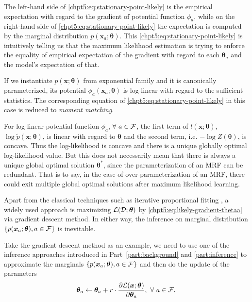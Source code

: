 The left-hand side of \eqref{chpt5:eq:stationary-point-likely} is the empirical expectation with regard to the gradient of potential function $\phi_a$, while on the right-hand side of \eqref{chpt5:eq:stationary-point-likely} the expectation is computed by the marginal distribution $p(\bm{x}_a; \bm{\theta})$. This \eqref{chpt5:eq:stationary-point-likely} is intuitively telling us that the maximum likelihood estimation is trying to enforce the equality of empirical expectation of the gradient with regard to each $\bm{\theta}_a$ and the model's expectation of that.
\begin{remark}
  If we instantiate $p(\bm{x};\bm{\theta})$ from exponential family and it is canonically parameterized, its potential $\phi_a(\bm{x}_a; \bm{\theta})$ is log-linear with regard to the sufficient statistics. The corresponding equation of \eqref{chpt5:eq:stationary-point-likely} in this case is reduced to \textit{moment matching}.

  For log-linear potential function $\phi_a$, $\forall ~a \in \mathcal{F}$, the first term of $l(\bm{x}; \bm{\theta})$, $\log{\tilde{p}(\bm{x};\bm{\theta})}$, is linear with regard to $\bm{\theta}$ and the second term, i.e. $-\log{Z(\bm{\theta})}$, is concave. Thus the log-likelihood is concave and there is a unique globally optimal log-likelihood value. But this does not necessarily mean that there is always a unique global optimal solution $\bm{\theta}^{\ast}$, since the parameterization of an MRF can be redundant. That is to say, in the case of over-parameterization of an MRF, there could exit multiple global optimal solutions after maximum likelihood learning.
  
\end{remark}

Apart from the classical techniques such as iterative proportional fitting \cite[Section~6.1]{wainwright2008graphical}\cite{eric10-708ipf}, a widely used approach is maximizing $\mathcal{L}(\mathcal{D}; \bm{\theta})$ by \eqref{chpt5:eq:likely-gradient-thetaa} via gradient descent method. In either way, the inference on marginal distribution $\left\{ p(\bm{x}_a; \bm{\theta}), a \in \mathcal{F} \right\}$ is inevitable.

Take the gradient descent method as an example, we need to use one of the inference approaches introduced in Part~\ref{part:background} and \ref{part:inference} to approximate the marginals $\left\{ p(\bm{x}_a; \bm{\theta}), a \in \mathcal{F} \right\}$ and then do the update of the parameters
\begin{equation}
  \bm{\theta}_a \leftarrow \bm{\theta}_a + r \cdot \frac{ \partial \mathcal{L}(\bm{x};\bm{\theta})}{\partial \bm{\theta}_a}, ~\forall~a \in \mathcal{F}.
\end{equation}

